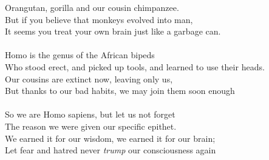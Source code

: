 \documentclass[twoside,16pt,openany,letterpaper]{memoir}%
\begin{document}
Orangutan, gorilla and our cousin chimpanzee.\\
But if you believe that monkeys evolved into man,\\
It seems you treat your own brain just like a garbage can.\\
\\
Homo is the genus of the African bipeds\\
Who stood erect, and picked up tools, and learned to use their heads.\\
Our cousins are extinct now, leaving only us,\\
But thanks to our bad habits, we may join them soon enough\\
\\
So we are Homo sapiens, but let us not forget\\
The reason we were given our specific epithet.\\
We earned it for our wisdom, we earned it for our brain;\\
Let fear and hatred never \textit{trump} our consciousness again\\
\end{document}
